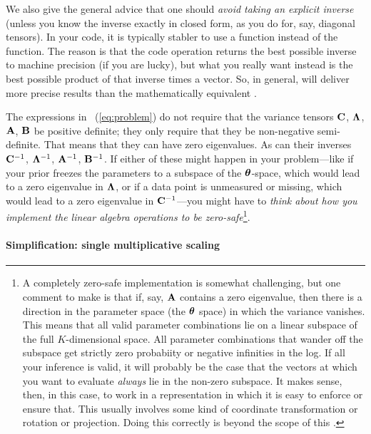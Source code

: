 We also give the general advice that one should \emph{avoid taking an explicit
inverse} (unless you know the inverse exactly in closed form, as you do
for, say, diagonal tensors).
In your code, it is typically stabler to use a  function instead
of the  function.
The reason is that the code operation  returns the best
possible inverse to machine precision (if you are lucky), but what you
really want instead is the best possible product of that inverse times
a vector.
So, in general,  will deliver more precise results than
the mathematically equivalent .

The expressions in \equationname~(\ref{eq:problem}) do not require that the variance tensors
$\mathbf{C}$, $\mathbf{\Lambda}$, $\mathbf{A}$, $\mathbf{B}$ be positive definite; they only require
that they be non-negative semi-definite.
That means that they can have zero eigenvalues.
As can their inverses $\mathbf{C}^{-1}$, $\mathbf{\Lambda}^{-1}$, $\mathbf{A}^{-1}$, $\mathbf{B}^{-1}$.
If either of these might happen in your problem---like if your prior
freezes the parameters to a subspace of the $\boldsymbol{\theta}$-space, which
would lead to a zero eigenvalue in $\mathbf{\Lambda}$, or if a data point is
unmeasured or missing, which would lead to a zero eigenvalue in
$\mathbf{C}^{-1}$---you might have to \emph{think about how you implement the
  linear algebra operations to be zero-safe}\footnote{A completely
  zero-safe implementation
  is somewhat challenging, but one comment to make is that if, say, $\mathbf{A}$
  contains a zero eigenvalue, then there is a direction in the parameter
  space (the $\boldsymbol{\theta}$ space) in which the variance vanishes. This means that
  all valid parameter combinations lie on a linear subspace of the full $K$-dimensional
  space. All parameter combinations that wander off the subspace get strictly
  zero probabiity or negative infinities in the log.
  If all your inference is valid, it will probably be the case that the
  vectors at which you want to evaluate \emph{always} lie in the non-zero
  subspace. It makes sense, then, in this case, to work in a representation in which it is easy
  to enforce or ensure that. This usually involves some kind of coordinate transformation
  or rotation or projection. Doing this correctly is beyond the scope of this \documentname.}.

\paragraph{Simplification: single multiplicative scaling}


